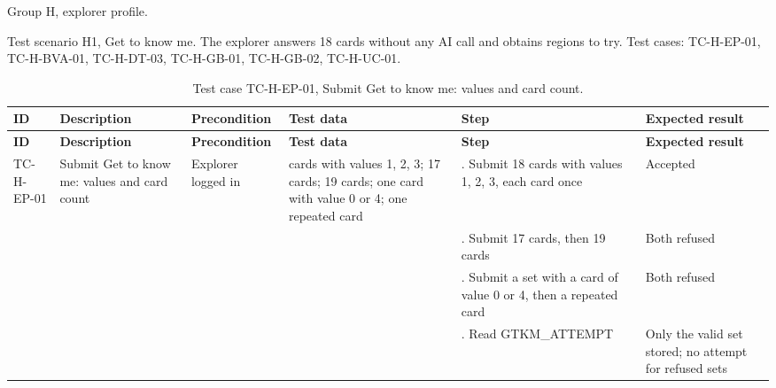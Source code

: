 Group H, explorer profile.

Test scenario H1, Get to know me. The explorer answers 18 cards without any AI call and obtains regions to try. Test cases: TC-H-EP-01, TC-\allowbreak{}H-\allowbreak{}BVA-\allowbreak{}01, TC-H-DT-03, TC-H-GB-01, TC-H-GB-02, TC-H-UC-01.

{\footnotesize{}\renewcommand{\arraystretch}{1.1}
\begin{longtable}{|>{\raggedright\arraybackslash}p{}|>{\raggedright\arraybackslash}p{}|>{\raggedright\arraybackslash}p{}|>{\raggedright\arraybackslash}p{}|>{\raggedright\arraybackslash}p{}|>{\raggedright\arraybackslash}p{}|}
\caption{Test case TC-H-EP-01, Submit Get to know me: values and card count.} \\
\hline
\textbf{ID} & \textbf{Description} & \textbf{Precondition} & \textbf{Test data} & \textbf{Step} & \textbf{Expected result} \\ \hline
\endfirsthead
\hline
\textbf{ID} & \textbf{Description} & \textbf{Precondition} & \textbf{Test data} & \textbf{Step} & \textbf{Expected result} \\ \hline
\endhead
TC-H-EP-01 & Submit Get to know me: values and card count & Explorer logged in & 18 cards with values 1, 2, 3; 17 cards; 19 cards; one card with value 0 or 4; one repeated card & 1. Submit 18 cards with values 1, 2, 3, each card once & Accepted \\ \cline{5-6}
 &  &  &  & 2. Submit 17 cards, then 19 cards & Both refused \\ \cline{5-6}
 &  &  &  & 3. Submit a set with a card of value 0 or 4, then a repeated card & Both refused \\ \cline{5-6}
 &  &  &  & 4. Read GTKM\_\allowbreak{}ATTEMPT & Only the valid set stored; no attempt for refused sets \\ \hline
\end{longtable}
}

